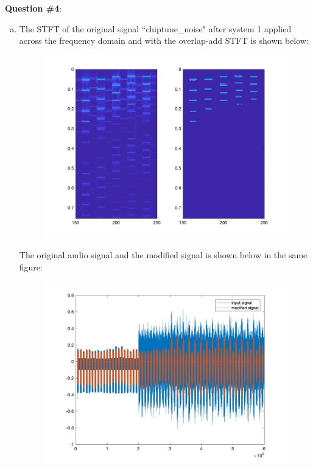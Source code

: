 \documentclass[a4paper]{article}
\begin{document}
\begin{spacing}{2.0}
\Large\textbf{Question \#4}:  
\normalsize
\begin{enumerate}[(a)]
\item The STFT of the original signal ``chiptune\_noise" after system 1 applied across the frequency domain and with the overlap-add STFT is shown below:
\begin{figure}[H]
\centering
\includegraphics[width=5in]{4a.jpg}
\label{fig:graph}
\end{figure}
The original audio signal and the modified signal is shown below in the same figure:
\begin{figure}[H]
\centering
\includegraphics[width=5in]{4a_audio.jpg}
\label{fig:graph}
\end{figure}


\end{enumerate}
\end{spacing}
\end{document}
